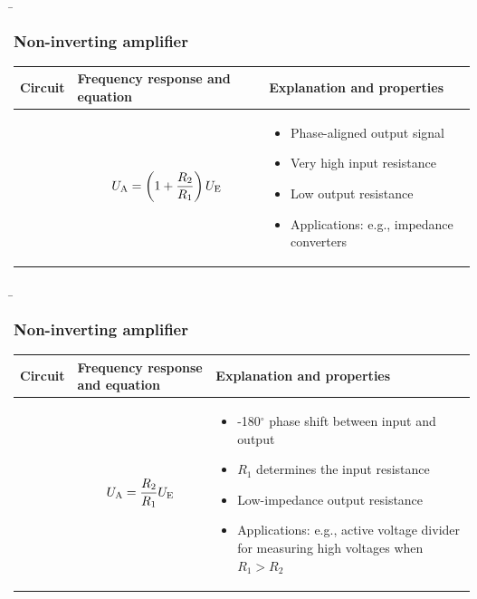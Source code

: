 \begin{frame}
    \b{
    \frametitle{Non-inverting amplifier}
    \centering
    \begin{table}[ht]
    \label{tab:NichtinvertierenderVerstaerker}
    \begin{tabular}{|m{}|m{}|m{}|}
    \hline
    Circuit & Frequency response and equation & Explanation and properties\\ %
    \hline
    \vspace{0.5cm}
    \centering
     & 
\vspace{1ex}
\[
U_{\textnormal{A}} = \left(1+\frac{R_2}{R_1}\right) U_{\textnormal{E}}
\]
    &
\begin{itemize}
    \item Phase-aligned output signal
    \item Very high input resistance
    \item Low output resistance
    \item Applications: e.g., impedance converters
\end{itemize} \\
    \hline
    \end{tabular}
    \end{table}
    }
\end{frame}


\begin{frame}
    \b{
    \frametitle{Non-inverting amplifier}
    \centering
    \begin{table}[ht]
    \label{tab:InvertierenderVerstaerker}
    \begin{tabular}{|m{}|m{}|m{}|}
    \hline
    Circuit & Frequency response and equation & Explanation and properties\\ %
    \hline
    \vspace{0.5cm}
    \centering
    
     & 
    \begin{center}
        
\end{center}
\vspace{1ex}
\[
    U_{\textnormal{A}} = \frac{R_2}{R_1} U_{\textnormal{E}}
\]
    &
\begin{itemize}
    \item -180$^\circ$ phase shift between input and output
    \item $R_1$ determines the input resistance
    \item Low-impedance output resistance
    \item Applications: \linebreak e.g., active voltage divider for measuring high voltages when $R_1 > R_2$
\end{itemize} \\
    \hline
    \end{tabular}
    \end{table}
    }
\end{frame}

